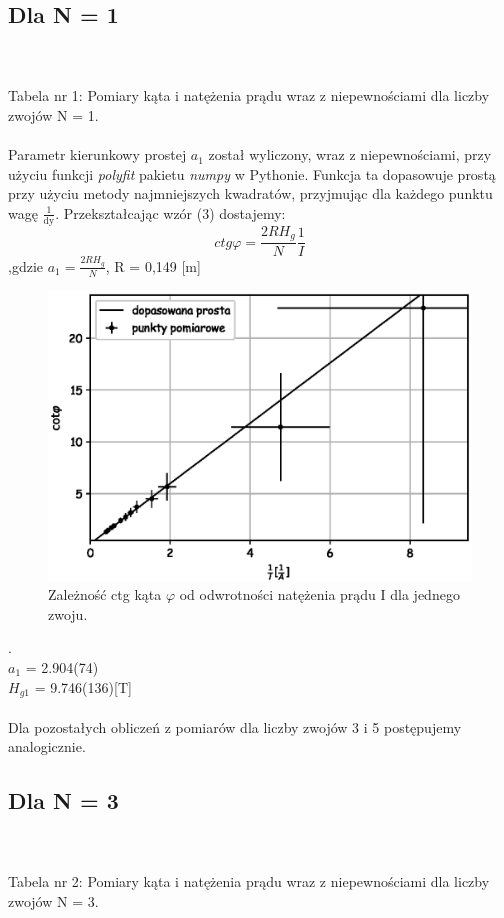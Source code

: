 \documentclass[a4paper,10pt]{article}
\begin{document}
\subsection{Dla N = 1}

\\
\\Tabela nr 1: Pomiary kąta i natężenia prądu wraz z niepewnościami dla liczby zwojów N = 1.
\\
\\Parametr kierunkowy prostej $a_1$ został wyliczony, wraz z niepewnościami, przy użyciu funkcji \emph{polyfit} pakietu \emph{numpy} w Pythonie. Funkcja ta
dopasowuje prostą przy użyciu metody najmniejszych kwadratów, przyjmując dla każdego punktu wagę $\frac{1}{\text{dy}}$. Przekształcając wzór (3) dostajemy:
\begin{equation}
ctg\varphi = \frac{2RH_g}{N}\frac{1}{I}
\end{equation}
,gdzie $a_1=\frac{2RH_g}{N}$, R = 0,149 [m]

\begin{figure}[H]
  \includegraphics{./wykres_1.eps}
  \renewcommand*{\figurename}{Wykres nr} 
  \caption{Zależność ctg kąta $\varphi$ od odwrotności natężenia prądu I dla jednego zwoju.}
  \label{}
\end{figure}.
\\$a_1$ = 2.904(74)\\
$H_{g1}$ = 9.746(136)[T]\\
\\Dla pozostałych obliczeń z pomiarów dla liczby zwojów 3 i 5 postępujemy analogicznie.

\subsection{Dla N = 3}

\\
\\Tabela nr 2: Pomiary kąta i natężenia prądu wraz z niepewnościami dla liczby zwojów N = 3.
\end{document}
